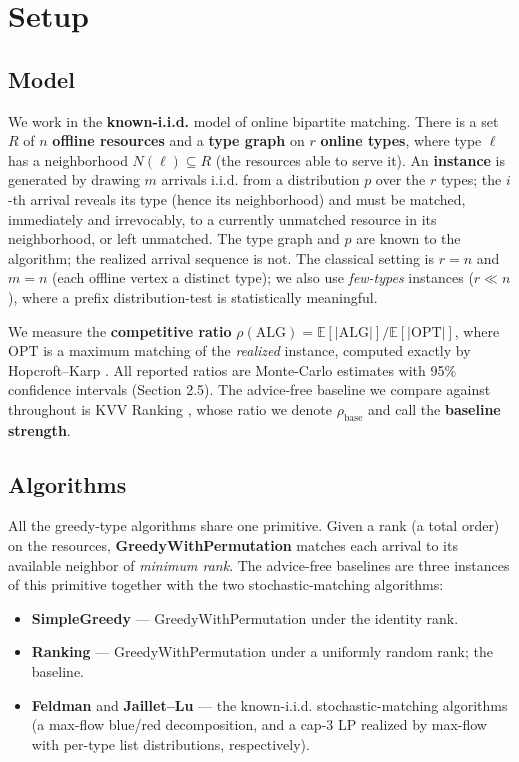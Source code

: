 \section{Setup}

\subsection{Model}

We work in the \textbf{known-i.i.d.} model of online bipartite matching.
There is a set \(R\) of \(n\) \textbf{offline resources} and a
\textbf{type graph} on \(r\) \textbf{online types}, where type \(\ell\)
has a neighborhood \(N(\ell)\subseteq R\) (the resources able to serve
it). An \textbf{instance} is generated by drawing \(m\) arrivals i.i.d.
from a distribution \(p\) over the \(r\) types; the \(i\)-th arrival
reveals its type (hence its neighborhood) and must be matched,
immediately and irrevocably, to a currently unmatched resource in its
neighborhood, or left unmatched. The type graph and \(p\) are known to
the algorithm; the realized arrival sequence is not. The classical
setting is \(r=n\) and \(m=n\) (each offline vertex a distinct type); we
also use \emph{few-types} instances (\(r\ll n\)), where a prefix
distribution-test is statistically meaningful.

We measure the \textbf{competitive ratio}
\(\rho(\mathrm{ALG}) = \mathbb{E}[|\mathrm{ALG}|] /
\mathbb{E}[|\mathrm{OPT}|]\), where \(\mathrm{OPT}\) is a maximum
matching of the \emph{realized} instance, computed exactly by
Hopcroft--Karp \cite{hopcroftkarp1973}. All reported ratios are
Monte-Carlo estimates with 95\% confidence intervals (Section 2.5). The
advice-free baseline we compare against throughout is KVV Ranking
\cite{kvv1990ranking}, whose ratio we denote \(\rho_{\mathrm{base}}\)
and call the \textbf{baseline strength}.

\subsection{Algorithms}

All the greedy-type algorithms share one primitive. Given a rank (a
total order) on the resources, \textbf{GreedyWithPermutation} matches
each arrival to its available neighbor of \emph{minimum rank}. The
advice-free baselines are three instances of this primitive together
with the two stochastic-matching algorithms:

\begin{itemize}
\tightlist
\item
  \textbf{SimpleGreedy} --- GreedyWithPermutation under the identity
  rank.
\item
  \textbf{Ranking} \cite{kvv1990ranking} --- GreedyWithPermutation under
  a uniformly random rank; the baseline.
\item
  \textbf{Feldman} \cite{feldman2009online} and \textbf{Jaillet--Lu}
  \cite{jailletlu2014online} --- the known-i.i.d. stochastic-matching
  algorithms (a max-flow blue/red decomposition, and a cap-3 LP realized
  by max-flow with per-type list distributions, respectively).
\end{itemize}

